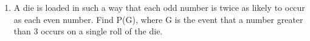 \begin{enumerate}[label=\thesection.\arabic*,ref=\thesection.\theenumi]
	\item A die is loaded in such a way that each odd number is twice as likely to occur as
each even number. Find P(G), where G is the event that a number greater than
3 occurs on a single roll of the die.
		\solution
		
\end{enumerate}
